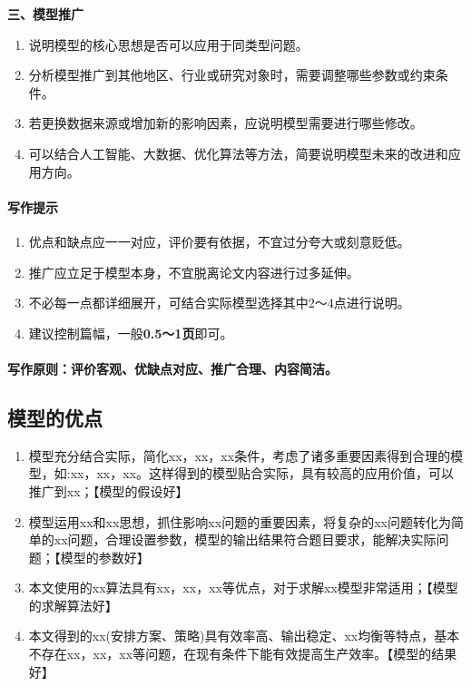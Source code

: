 \textbf{三、模型推广}

\begin{enumerate}
\item 说明模型的核心思想是否可以应用于同类型问题。

\item 分析模型推广到其他地区、行业或研究对象时，需要调整哪些参数或约束条件。

\item 若更换数据来源或增加新的影响因素，应说明模型需要进行哪些修改。

\item 可以结合人工智能、大数据、优化算法等方法，简要说明模型未来的改进和应用方向。
\end{enumerate}
\paragraph{写作提示}
\begin{enumerate}
\item 优点和缺点应一一对应，评价要有依据，不宜过分夸大或刻意贬低。

\item 推广应立足于模型本身，不宜脱离论文内容进行过多延伸。

\item 不必每一点都详细展开，可结合实际模型选择其中2～4点进行说明。

\item 建议控制篇幅，一般\textbf{0.5～1页}即可。
\end{enumerate}
\paragraph{写作原则：评价客观、优缺点对应、推广合理、内容简洁。}
\subsection{模型的优点}
\begin{enumerate}
\item 模型充分结合实际，简化xx，xx，xx条件，考虑了诸多重要因素得到合理的模型，如:xx，xx，xx。这样得到的模型贴合实际，具有较高的应用价值，可以推广到xx；【模型的假设好】
\item 模型运用xx和xx思想，抓住影响xx问题的重要因素，将复杂的xx问题转化为简单的xx问题，合理设置参数，模型的输出结果符合题目要求，能解决实际问题；【模型的参数好】
\item 本文使用的xx算法具有xx，xx，xx等优点，对于求解xx模型非常适用；【模型的求解算法好】
\item 本文得到的xx(安排方案、策略)具有效率高、输出稳定、xx均衡等特点，基本不存在xx，xx，xx等问题，在现有条件下能有效提高生产效率。【模型的结果好】
\end{enumerate}
